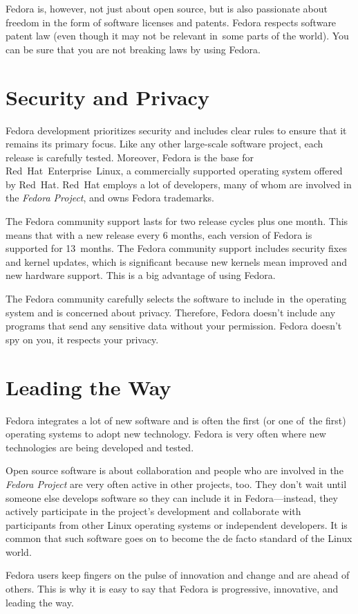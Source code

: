 Fedora is, however, not just about open source, but is also passionate about freedom in the form of software licenses and patents. Fedora respects software patent law (even though it may not be relevant in~some parts of the world). You can be sure that you are not breaking laws by using Fedora.

\section*{Security and Privacy}

Fedora development prioritizes security and includes clear rules to ensure that it remains its primary focus. Like any other large-scale software project, each release is carefully tested. Moreover, Fedora is the base for Red~Hat~Enterprise~Linux, a commercially supported operating system offered by Red~Hat. Red~Hat employs a lot of developers, many of whom are involved in the \emph{Fedora Project}, and owns Fedora trademarks.

The Fedora community support lasts for two release cycles plus one month. This means that with a new release every 6 months, each version of Fedora is supported for 13~months. The Fedora community support includes security fixes and kernel updates, which is significant because new kernels mean improved and new hardware support. This is a big advantage of using Fedora.

The Fedora community carefully selects the software to include in~the operating system and is concerned about privacy. Therefore, Fedora doesn't include any programs that send any sensitive data without your permission. Fedora doesn't spy on you, it respects your privacy.

\section*{Leading the Way}

Fedora integrates a lot of new software and is often the first (or one of~the first) operating systems to adopt new technology. Fedora is very often where new technologies are being developed and tested.

Open source software is about collaboration and people who are involved in the \emph{Fedora Project} are very often active in other projects, too. They don't wait until someone else develops software so they can include it in Fedora---instead, they actively participate in the project's development and collaborate with participants from other Linux operating systems or independent developers. It is common that such software goes on to become the de facto standard of the Linux world.

Fedora users keep fingers on the pulse of innovation and change and are ahead of others. This is why it is easy to say that Fedora is progressive, innovative, and leading the way.
\endinput
